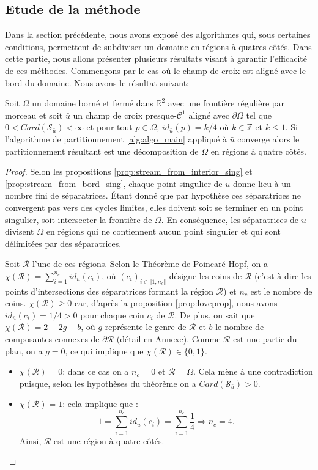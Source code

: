 \subsection{Etude de la méthode}
\label{subsec:etude_de_la_methode}
Dans la section précédente, nous avons exposé des algorithmes qui, sous certaines conditions, permettent de subdiviser un domaine en régions à quatres côtés. Dans cette partie, nous allons présenter plusieurs résultats visant à garantir l'efficacité de ces méthodes. Commençons par le cas où le champ de croix est aligné avec le bord du domaine. Nous avons le résultat suivant:
\begin{theorem}
\label{thm:theorem1}
Soit $\Omega$ un domaine borné et fermé dans $\mathbb{R}^2$ avec une frontière régulière par morceau et soit $\bar{u}$ un champ de croix presque-$\mathcal{C}^1$ aligné avec $\partial\Omega$ tel que $0<Card(\mathcal{S}_{\bar{u}})<\infty$ et pour tout $p\in\Omega$, $id_{\bar{u}}(p)=k/4$ où $k\in\mathbb{Z}$ et $k\leq 1$. Si l'algorithme de partitionnement \ref{alg:algo_main} appliqué à $\bar{u}$ converge alors le partitionnement résultant est une décomposition de $\Omega$ en régions à quatre côtés.
\end{theorem}

\begin{proof}
Selon les propositions \ref{prop:stream_from_interior_sing} et \ref{prop:stream_from_bord_sing}, chaque point singulier de $u$ donne lieu à un nombre fini de séparatrices. Étant donné que par hypothèse ces séparatrices ne convergent pas vers des cycles limites, elles doivent soit se terminer en un point singulier, soit intersecter la frontière de $\Omega$. En conséquence, les séparatrices de $\bar{u}$ divisent $\Omega$ en régions qui ne contiennent aucun point singulier et qui sont délimitées par des séparatrices.

Soit $\mathcal{R}$ l'une de ces régions. Selon le Théorème de Poincaré-Hopf, on a $\chi(\mathcal{R})=\sum_{i=1}^{n_c} id_{\bar{u}}(c_i)$, où $(c_i)_{i\in\llbracket1,n_c\rrbracket}$ désigne les coins de $\mathcal{R}$ (c'est à dire les points d'intersections des séparatrices formant la région $\mathcal{R}$) et $n_c$ est le nombre de coins. $\chi(\mathcal{R})\geq0$ car, d'après la proposition \ref{prop:loveprop}, nous avons $id_{\bar{u}}(c_i)=1/4>0$ pour chaque coin $c_i$ de $\mathcal{R}$. De plus, on sait que $\chi(\mathcal{R}) = 2 - 2g - b$, où $g$ représente le genre de $\mathcal{R}$ et $b$ le nombre de composantes connexes de $\partial\mathcal{R}$ (détail en Annexe). Comme $\mathcal{R}$ est une partie du plan, on a $g = 0$, ce qui implique que $\chi(\mathcal{R})\in\{0, 1\}$.
\begin{itemize}
\item $\chi(\mathcal{R})=0$: dans ce cas on a $n_c=0$ et $\mathcal{R}=\Omega$. Cela mène à une contradiction puisque, selon les hypothèses du théorème on a $Card(\mathcal{S}_{\bar{u}})>0$.
\item $\chi(\mathcal{R})=1$: cela implique que :
$$1=\sum_{i=1}^{n_c}id_u(c_i)=\sum_{i=1}^{n_c}\frac{1}{4}\Longrightarrow n_c=4.$$
Ainsi, $\mathcal{R}$ est une région à quatre côtés.
\end{itemize}
\end{proof}

